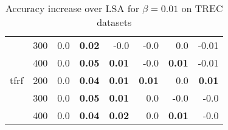 \begin{table}[h]
\begin{center}
\begin{tabular}{ll|rrrrrr}
   & 300 &       0.0 &  \textbf{0.02} &       -0.0 &      -0.0 &       0.0 &      -0.01 \\
   & 400 &       0.0 &  \textbf{0.05} &  \textbf{0.01} &      -0.0 &  \textbf{0.01} &      -0.01 \\
tfrf & 200 &       0.0 &  \textbf{0.04} &  \textbf{0.01} &  \textbf{0.01} &       0.0 &  \textbf{0.01} \\
   & 300 &       0.0 &  \textbf{0.05} &  \textbf{0.01} &       0.0 &      -0.0 &      -0.0 \\
   & 400 &       0.0 &  \textbf{0.04} &  \textbf{0.02} &       0.0 &  \textbf{0.01} &      -0.0 \\
\bottomrule
\end{tabular}

\caption[Accuracy increase over LSA for $\beta=0.01$ on TREC datasets]{Accuracy increase over LSA for $\beta=0.01$ on TREC datasets}
\label{tab:batch:results:trec0.01}
\end{center}
\end{table}


